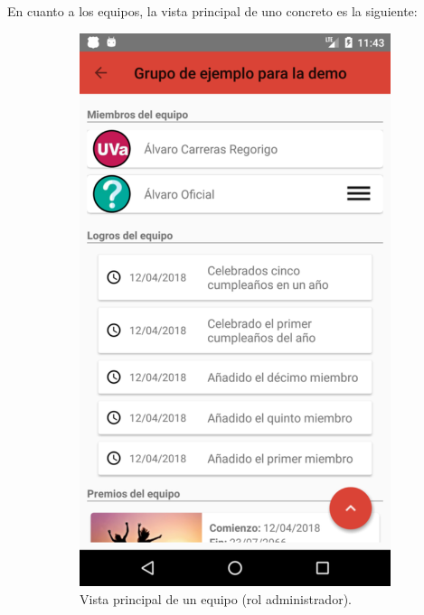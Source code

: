 \documentclass[twoside]{report}
\begin{document}
En cuanto a los equipos, la vista principal de uno concreto es la siguiente:
\begin{figure}[H]
\begin{center}
	\begin{subfigure}[t]{.3\linewidth}
		\includegraphics[scale=0.2]{images/userguide/14.png}
		\caption{Vista principal de un equipo (rol administrador).}
	\end{subfigure}\hspace{2mm}%
	\begin{subfigure}[t]{.3\linewidth}

\end{subfigure}
\end{center}
\end{figure}
\end{document}
